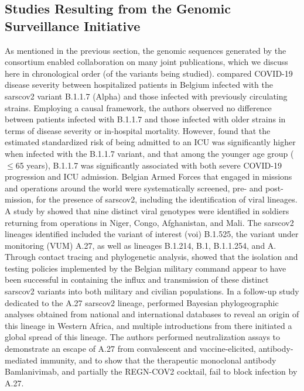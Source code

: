 \subsection{Studies Resulting from the Genomic Surveillance Initiative}
As mentioned in the previous section, the genomic sequences generated by the consortium enabled collaboration on many joint publications, which we discuss here in chronological order (of the variants being studied).
\citet{vangoethem2022severity} compared COVID-19 disease severity between hospitalized patients in Belgium infected with the \gls{sarscov2} variant B.1.1.7 (Alpha) and those infected with previously circulating strains.
Employing a causal framework, the authors observed no difference between patients infected with B.1.1.7 and those infected with older strains in terms of disease severity or in-hospital mortality.
However, \citet{vangoethem2022severity} found that the estimated standardized risk of being admitted to an ICU was significantly higher when infected with the B.1.1.7 variant, and that among the younger age group ($\leq$65 years), B.1.1.7 was significantly associated with both severe COVID-19 progression and ICU admission.
Belgian Armed Forces that engaged in missions and operations around the world were systematically screened, pre- and post-mission, for the presence of \gls{sarscov2}, including the identification of viral lineages.
A study by \citet{pirnay2021variant} showed that nine distinct viral genotypes were identified in soldiers returning from operations in Niger, Congo, Afghanistan, and Mali.
The \gls{sarscov2} lineages identified included the variant of interest (\gls{voi}) B.1.525, the variant under monitoring (VUM) A.27, as well as lineages B.1.214, B.1, B.1.1.254, and A.
Through contact tracing and phylogenetic analysis, \citet{pirnay2021variant} showed that the isolation and testing policies implemented by the Belgian military command appear to have been successful in containing the influx and transmission of these distinct \gls{sarscov2} variants into both military and civilian populations.
In a follow-up study dedicated to the A.27 \gls{sarscov2} lineage, \citet{kaleta2022antibody} performed Bayesian phylogeographic analyses obtained from national and international databases to reveal an origin of this lineage in Western Africa, and multiple introductions from there initiated a global spread of this lineage.
The authors performed neutralization assays to demonstrate an escape of A.27 from convalescent and vaccine-elicited, antibody-mediated immunity, and to show that the therapeutic monoclonal antibody Bamlanivimab, and partially the REGN-COV2 cocktail, fail to block infection by A.27.
